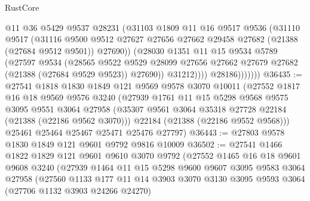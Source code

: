\begin{lexlean}{RustCore}
\begin{coremodule}
                      @11
                      @36
                      @5429
                      @9537
                      @28231
                      (@31103
                        @1809
                        @11
                        @16
                        @9517
                        @9536
                        (@31110
                          @9517
                          (@31116
                            @9500
                            @9512
                            @27627
                            @27656
                            @27662
                            @29458
                            @27682
                            (@21388 (@27684 @9512 @9501))
                            @27690))
                        (@28030
                          @1351
                          @11
                          @15
                          @9534
                          @5789
                          (@27597
                            @9534
                            (@28565
                              @9522
                              @9529
                              @28099
                              @27656
                              @27662
                              @27679
                              @27682
                              (@21388 (@27684 @9529 @9523))
                              @27690))
                          @31212))))
                  @28186)))))))
@36435 := @27541
    @1818
    @1830
    @1849
    @121
    @9569
    @9578
    @3070
    @10011
    (@27552
      @1817
      @16
      @18
      @9569
      @9576
      @3240
      (@27939
        @1761
        @11
        @15
        @5298
        @9568
        @9575
        @3095
        @9551
        @3064
        @27958
        (@35307 @9561 @3064 @35318 @27728 @22184 (@21388 (@22186 @9562 @3070)))
        @22184
        (@21388 (@22186 @9552 @9568)))
      @25461
      @25464
      @25467
      @25471
      @25476
      @27797)
@36443 := @27803 @9578 @1830 @1849 @121 @9601 @9792 @9816 @10009
@36502 := @27541
    @1466
    @1822
    @1829
    @121
    @9601
    @9610
    @3070
    @9792
    (@27552
      @1465
      @16
      @18
      @9601
      @9608
      @3240
      (@27939
        @1464
        @11
        @15
        @5298
        @9600
        @9607
        @3095
        @9583
        @3064
        @27958
        (@27560
          @1133
          @177
          @11
          @14
          @3903
          @3070
          @3130
          @3095
          @9593
          @3064
          (@27706 @1132 @3903 @24266 @24270)

\end{coremodule}
\end{lexlean}
